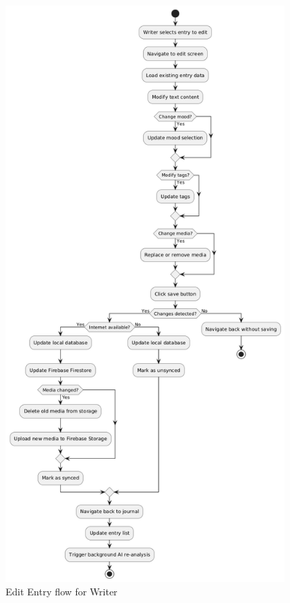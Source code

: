 \begin{figure}[H]
\centering
\includegraphics[width=0.95\textwidth,height=0.7\textheight,keepaspectratio]{files/imgs/edit_entry_flow.png}
\caption{Edit Entry flow for Writer}
\label{fig:edit-entry-flow}
\end{figure}
\clearpage

